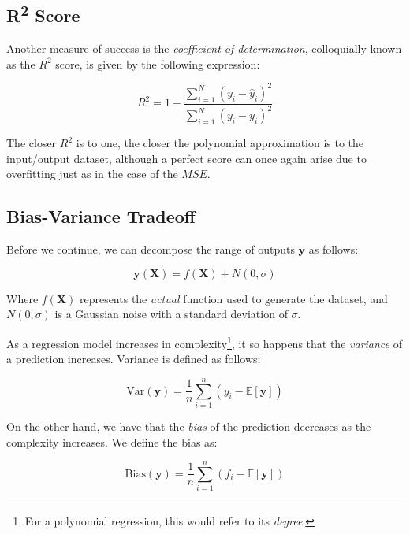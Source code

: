 \documentclass[a4paper,10pt,english]{article}
\begin{document}
	\subsection*{R\textsuperscript{2} Score}
	
	Another measure of success is the \textit{coefficient of determination}, colloquially known as the $R^2$ score, is given by the following expression:
	
	\begin{equation}
	R^2 = 1 - \frac{\sum_{i=1}^N (y_i - \hat{y}_i)^2 }{\sum_{i=1}^N (y_i - \bar{y}_i)^2 }
	\end{equation}
	
	The closer $R^2$ is to one, the closer the polynomial approximation is to the input/output dataset, although a perfect score can once again arise due to overfitting just as in the case of the $MSE$.
	
	\subsection*{Bias-Variance Tradeoff}
	
	Before we continue, we can decompose the range of outputs $\mathbf{y}$ as follows:
	
	\begin{equation}
	\label{eq_method_5}
	\mathbf{y}(\mathbf{X}) = f(\mathbf{X}) + N(0, \sigma) 
	\end{equation}
	
	Where $f(\mathbf{X})$ represents the \textit{actual} function used to generate the dataset, and $N(0,\sigma)$ is a Gaussian noise with a standard deviation of $\sigma$.
	
	As a regression model increases in complexity\footnote{For a polynomial regression, this would refer to its \textit{degree}.}, it so happens that the \textit{variance} of a prediction increases.  Variance is defined as follows:
	
	\begin{equation}
	\label{eq_method_6}
	\text{Var}(\mathbf{y}) = \frac{1}{n} \sum_{i=1}^{n} (y_i - \mathbb{E}[\mathbf{y}] )
	\end{equation}
	
	On the other hand, we have that the \textit{bias} of the prediction decreases as the complexity increases.  We define the bias as:
	
	\begin{equation}
	\label{eq_method_7}
	\text{Bias}(\mathbf{y}) = \frac{1}{n} \sum_{i=1}^{n} (f_i - \mathbb{E}[\mathbf{y}] )
	\end{equation}
	
\end{document}
